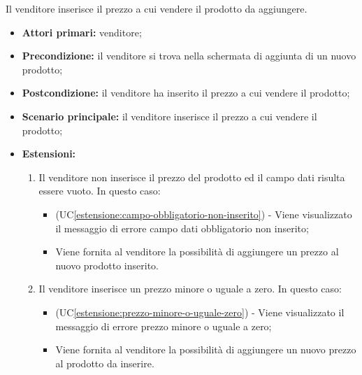Il venditore inserisce il prezzo a cui vendere il prodotto da aggiungere.
\begin{itemize}
    \item \textbf{Attori primari:} venditore;
    \item \textbf{Precondizione:} il venditore si trova nella schermata di aggiunta di un nuovo prodotto;
    \item \textbf{Postcondizione:} il venditore ha inserito il prezzo a cui vendere il prodotto;
    \item \textbf{Scenario principale:} il venditore inserisce il prezzo a cui vendere il prodotto;
    \item \textbf{Estensioni:}
    \begin{enumerate}[label=\lett]
    	\item Il venditore non inserisce il prezzo del prodotto ed il campo dati risulta essere vuoto. In questo caso:
    	\begin{itemize}
    		\item (UC\ref{estensione:campo-obbligatorio-non-inserito}) - Viene visualizzato il messaggio di errore campo dati obbligatorio non inserito;
    		\item Viene fornita al venditore la possibilità di aggiungere un prezzo al nuovo prodotto inserito.
    	\end{itemize}
    	\item Il venditore inserisce un prezzo minore o uguale a zero. In questo caso:
    	\begin{itemize}
    		\item (UC\ref{estensione:prezzo-minore-o-uguale-zero}) - Viene visualizzato il messaggio di errore prezzo minore o uguale a zero;
    		\item Viene fornita al venditore la possibilità di aggiungere un nuovo prezzo al prodotto da inserire.
    	\end{itemize}
    \end{enumerate}
\end{itemize}

\label{aggiunta-prodotto.sconto}


